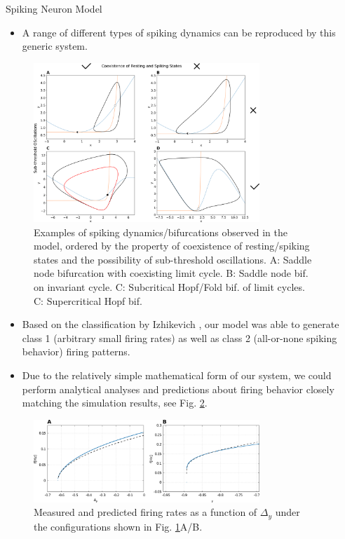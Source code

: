 \documentclass{beamer}
\begin{document}
\begin{frame}[t]
\begin{columns}[t]
\begin{column}{.45\textwidth}
\begin{myblock}{Spiking Neuron Model}
\begin{itemize}
\item A range of different types of spiking dynamics can be reproduced by this generic system.
\end{itemize}
\begin{figure}
\includegraphics[width=0.8\textwidth]{../figures/graphics/bif_types_combined_figure.png}
\caption{Examples of spiking dynamics/bifurcations observed in the model, ordered by the property of coexistence of resting/spiking states and the possibility of sub-threshold oscillations. A: Saddle node bifurcation with coexisting limit cycle. B: Saddle node bif. on invariant cycle. C: Subcritical Hopf/Fold bif. of limit cycles. C: Supercritical Hopf bif.}
\label{fig:bif_types_combined}
\end{figure}
\begin{itemize}
\item Based on the classification by Izhikevich \cite{Izhikevich_2007}, our model was able to generate class 1 (arbitrary small firing rates) as well as class 2 (all-or-none spiking behavior) firing patterns.
\item Due to the relatively simple mathematical form of our system, we could perform analytical analyses and predictions about firing behavior closely matching the simulation results, see Fig. \ref{fig:saddle_bif_fir_rates}.
\end{itemize}
\begin{figure}
\includegraphics[width=0.8\textwidth]{../figures/graphics/saddle_bif_fir_rates_combined.png}
\caption{Measured and predicted firing rates as a function of $\Delta_y$ under the configurations shown in Fig. \ref{fig:bif_types_combined}A/B.}
\label{fig:saddle_bif_fir_rates}
\end{figure}
\end{myblock}
\end{column}
\begin{column}{.45\textwidth}


\end{column}
\end{columns}
\end{frame}
\end{document}
